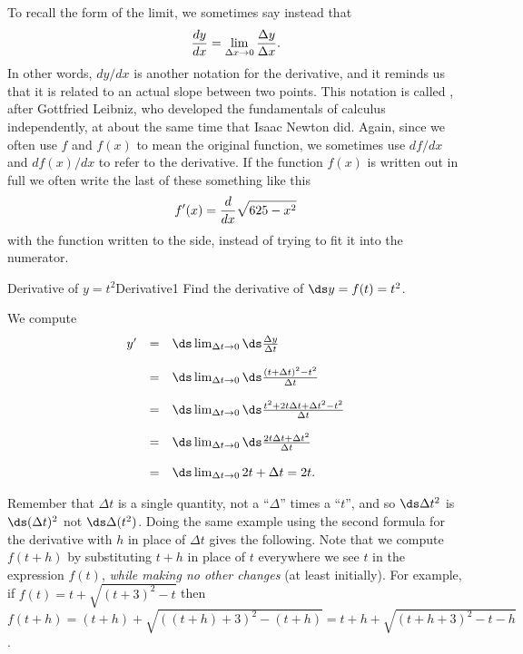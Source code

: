 To recall the form of the limit, we sometimes say instead that
$$
{dy\over dx}=\lim_{\Delta x\to0} {\Delta y\over \Delta x}.
$$ 
In other words, $dy/dx$ is another notation for the derivative, and
it reminds us that it is related to an actual slope between two
points. This notation is called , 
after Gottfried Leibniz, who developed the fundamentals
of calculus independently, at about the same time that Isaac Newton
did.  Again, since we often use $f$ and $f(x)$ to mean the original
function, we sometimes use $df/dx$ and $df(x)/dx$ to refer to the
derivative. If the function $f(x)$ is written out in full we often
write the last of these something like this
$$f'(x)={d\over dx}\sqrt{625-x^2}$$
with the function written to the side, instead of trying to fit it into
the numerator.

\begin{example}{Derivative of $y=t^2$}{Derivative1}
Find the derivative of $\ds y=f(t)=t^2$.
\end{example}

\begin{solution} 
We compute 
\[ \begin{array}{rll}
y' &=& \ds\lim_{\Delta t\to0}\ds\frac{\Delta y}{\Delta t}  \\
\\
	&=&\ds\lim_{\Delta t\to0}\ds\frac{(t+\Delta t)^2-t^2}{\Delta t} \\
	\\
&=&\ds\lim_{\Delta t\to0}\ds\frac{t^2+2t\Delta t+\Delta t^2-t^2}{\Delta t} \\
\\
&=&\ds\lim_{\Delta t\to0}\ds\frac{2t\Delta t+\Delta t^2}{\Delta t} \\
\\
&=&\ds\lim_{\Delta t\to0} 2t+\Delta t=2t. \\
\end{array}\]
\end{solution}

Remember that $\Delta t$ is a single quantity, not a ``$\Delta$''
times a ``$t$'', and so $\ds \Delta t^2$ is $\ds (\Delta t)^2$ not 
$\ds \Delta (t^2)$.
Doing the same example using the second formula for the derivative with $h$ in place of $\Delta t$ gives the following.
Note that we compute $f(t+h)$ by substituting $t+h$ in place of $t$ everywhere we see $t$ in the expression $f(t)$,
\textit{while making no other changes} (at least initially). For example, if $f(t)=t+\sqrt{(t+3)^2-t}$ then $f(t+h)=(t+h)+\sqrt{((t+h)+3)^2-(t+h)}=t+h+\sqrt{(t+h+3)^2-t-h}$.

